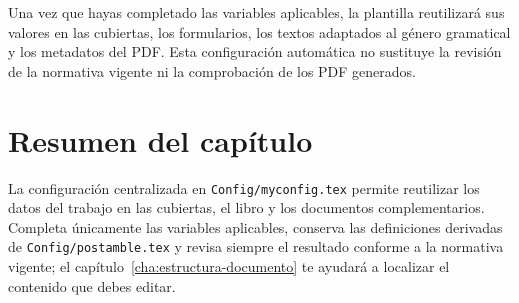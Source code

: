 Una vez que hayas completado las variables aplicables, la plantilla reutilizará sus valores en las cubiertas, los formularios, los textos adaptados al género gramatical y los metadatos del PDF. Esta configuración automática no sustituye la revisión de la normativa vigente ni la comprobación de los PDF generados.


\section{Resumen del capítulo}
\label{sec:resumen-configuracion}

La configuración centralizada en \texttt{Config/myconfig.tex} permite reutilizar los datos del trabajo en las cubiertas, el libro y los documentos complementarios. Completa únicamente las variables aplicables, conserva las definiciones derivadas de \texttt{Config/postamble.tex} y revisa siempre el resultado conforme a la normativa vigente; el capítulo~\ref{cha:estructura-documento} te ayudará a localizar el contenido que debes editar.








